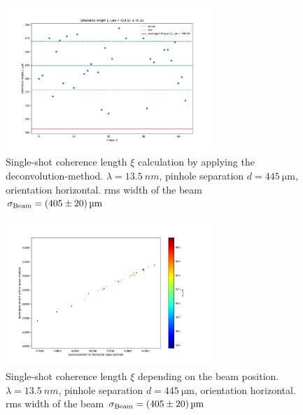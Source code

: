 \documentclass{osa-article}
\begin{document}
\begin{figure}[htbp]
    \centering
    \includegraphics[width=0.7\textwidth]{gfx/13p5nm_S_445um/coherencelength_FLASH2_USER1-2017-11-29T1007.pdf}
    \caption{Single-shot coherence length $\xi$ calculation by applying the deconvolution-method. $\lambda=\SI{13.5}{nm}$, pinhole separation $d=\SI{445}{\micro\meter}$, orientation horizontal. rms width of the beam $\sigma_{\textup{Beam}} = \SI[separate-uncertainty=true]{405(20)}{\micro\meter}$}
    \label{fig:13p5nm_S_445um_coherencelength_FLASH2_USER1-2017-11-29T1007}
\end{figure}

\begin{figure}[htbp]
    \centering
    \includegraphics[width=0.7\textwidth]{gfx/13p5nm_S_445um/coherencelength_vs_position_FLASH2_USER1-2017-11-29T1007.pdf}
    \caption{Single-shot coherence length $\xi$ depending on the beam position. $\lambda=\SI{13.5}{nm}$, pinhole separation $d=\SI{445}{\micro\meter}$, orientation horizontal. rms width of the beam $\sigma_{\textup{Beam}} = \SI[separate-uncertainty=true]{405(20)}{\micro\meter}$}
    \label{fig:13p5nm_S_445um_coherencelength_vs_position_FLASH2_USER1-2017-11-29T1007}
\end{figure}
\end{document}
